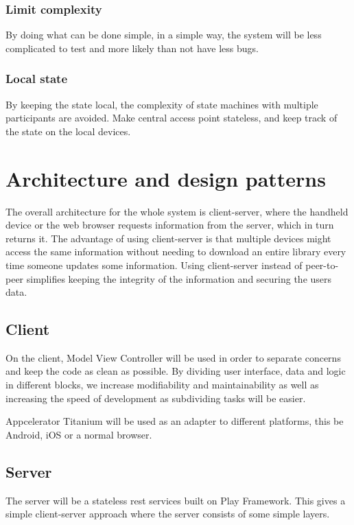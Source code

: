 \documentclass[11pt]{book}
\begin{document}
\subsubsection{Limit complexity}
By doing what can be done simple, in a simple way, the system will be less complicated to test and more likely than not have less bugs.

\subsubsection{Local state}
By keeping the state local, the complexity of state machines with multiple participants are avoided. Make central access point stateless, and keep track of the state on the local devices.

\section{Architecture and design patterns}

The overall architecture for the whole system is client-server, where the handheld device or the web browser requests information from the server, which in turn returns it. The advantage of using client-server is that multiple devices might access the same information without needing to download an entire library every time someone updates some information. Using client-server instead of peer-to-peer simplifies keeping the integrity of the information and securing the users data.

\subsection{Client}
On the client, Model View Controller will be used in order to separate concerns and keep the code as clean as possible. By dividing user interface, data and logic in different blocks, we increase modifiability and maintainability as well as increasing the speed of development as subdividing tasks will be easier.

Appcelerator Titanium will be used as an adapter to different platforms, this be Android, iOS or a normal browser.

\subsection{Server}
The server will be a stateless \gls{rest} services built on Play Framework. This gives a simple client-server approach where the server consists of some simple layers.
\end{document}
